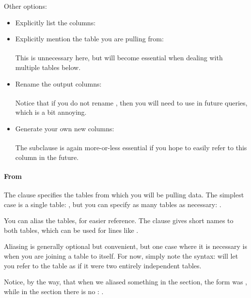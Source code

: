 Other options:\begin{itemize}
\item Explicitly list the columns:\\ 
\item Explicitly mention the table you are pulling from:\\
\\
This is unnecessary here, but will become
essential when dealing with multiple tables below.
\item Rename the output columns:\\
\\ 
Notice that if you do not rename , then you will need to use  in future
queries, which is a
bit annoying.
\item Generate your own new columns:\\
\\
The  subclause is again more-or-less
essential if you hope to easily refer to this column in the future. 
\end{itemize}

\paragraph{From} The  clause specifies the tables from which
you will be pulling data. The simplest case is a single table: , but you can specify as many tables as necessary: . 

You can alias the tables, for easier reference. The clause 
 gives short names to both tables, which can
be used for lines like . 

Aliasing is generally optional but convenient, but one case where
it is necessary is when you are joining a table to itself.
For now, simply note the syntax:  will let
you refer to the  table as if it were two entirely independent
tables. 

Notice, by the way, that when we aliased something in the 
section, the form was , while
in the  section there is no : .

